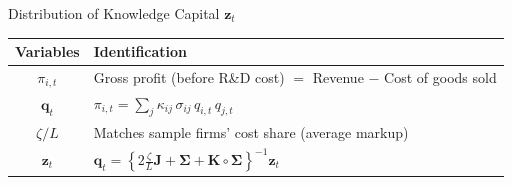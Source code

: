 \documentclass[
  10pt, %
  aspectratio=169,  %
  handout
]{beamer}
\theoremstyle{plain}
\begin{document}
%
\begin{frame}{Distribution of Knowledge Capital $\boldsymbol{z}_t$}
  \begin{table}[htbp]
    \centering
    \begin{tabular}{cl}
      \toprule
     Variables & Identification \\
      \midrule
      $\pi_{i,t}$ 
        & Gross profit (before R\&D cost) 
          $=$ Revenue $-$ Cost of goods sold \\[6pt]
      $\boldsymbol{q}_t$
        &
          $\pi_{i,t}=\displaystyle\sum_{j}\kappa_{ij}\,\sigma_{ij}\,q_{i,t}\,q_{j,t}$ \\[6pt]
      $\zeta/L$
        & Matches sample firms’ cost share (average markup) \\[6pt]
      $\boldsymbol{z}_t$
        &
          $\displaystyle \boldsymbol{q}_{t}
           =\left\{2\frac{\zeta}{L}\boldsymbol{J}+\boldsymbol{\Sigma}+\boldsymbol{K}\circ\boldsymbol{\Sigma}\right\}^{-1}\boldsymbol{z}_{t}$ \\
      \bottomrule
    \end{tabular}
  \end{table}
\end{frame}
%
\end{document}
